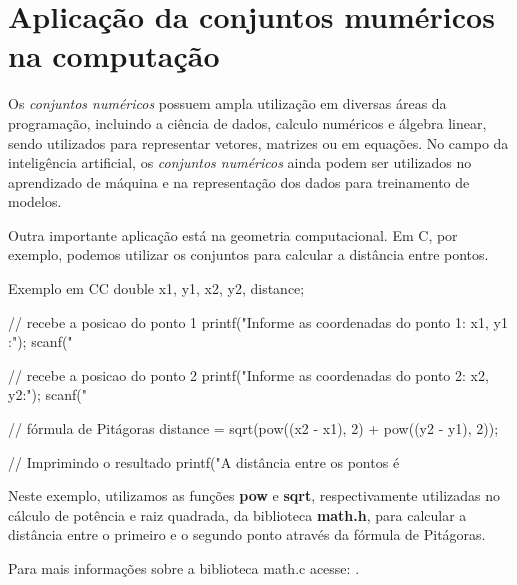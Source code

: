 \section{Aplicação da conjuntos muméricos na computação}

Os \emph{conjuntos numéricos} possuem ampla utilização em diversas áreas da programação, incluindo a ciência de dados, calculo numéricos e álgebra linear, sendo utilizados para representar vetores, matrizes ou em equações. No campo da inteligência artificial, os \emph{conjuntos numéricos} ainda podem ser utilizados no aprendizado de máquina e na representação dos dados para treinamento de modelos.

Outra importante aplicação está na geometria computacional. Em C, por exemplo, podemos utilizar os conjuntos para calcular a distância entre pontos. \\

\begin{codesnip}{Exemplo em C}{C}
    double x1, y1, x2, y2, distance;

    // recebe a posicao do ponto 1
    printf("Informe as coordenadas do ponto 1: x1, y1 :\n");
    scanf("%

    // recebe a posicao do ponto 2
    printf("Informe as coordenadas do ponto 2: x2, y2:\n");
    scanf("%

    // fórmula de Pitágoras
    distance = sqrt(pow((x2 - x1), 2) + pow((y2 - y1), 2));

    // Imprimindo o resultado
    printf("A distância entre os pontos é %
\end{codesnip}

Neste exemplo, utilizamos as funções \textbf{pow} e \textbf{sqrt}, respectivamente utilizadas no cálculo de potência e raiz quadrada, da biblioteca \textbf{math.h}, para calcular a distância entre o primeiro e o segundo ponto através da fórmula de Pitágoras.

Para mais informações sobre a biblioteca math.c acesse: . \\




